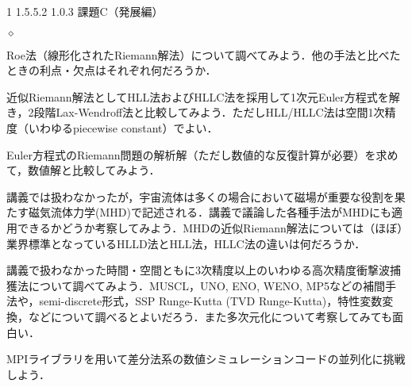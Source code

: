 \documentclass[10pt,a4j]{jarticle}
\makeatletter
\renewenvironment{itemize}%
{%
\begin{list}{$\diamond$}
{%
  \setlength{\topsep}{0.0em}
  \setlength{\parskip}{0.0em}
  \setlength{\parsep}{0.0em}
  \setlength{\itemsep}{0.25em}
  \setlength{\itemindent}{1zw}
  \setlength{\leftmargin}{2zw}
  \setlength{\rightmargin}{0zw}
  \setlength{\labelsep}{0.5zw}
  \setlength{\labelwidth}{1zw}
  \setlength{\listparindent}{0zw}
}
}{%
\end{list}%
}
\renewcommand{\section}{\@startsection{section}%
   {1}%
   {\z@}%
   {1.5\Cvs \@plus.5\Cvs \@minus.2\Cvs}%
   {1.0\Cvs \@plus.3\Cvs}%
   {\centering\normalfont\LARGE\bfseries}}%
\makeatother
\begin{document}
\hypertarget{ux8ab2ux984ccux767aux5c55ux7de8}{%
\section{課題C（発展編）}\label{ux8ab2ux984ccux767aux5c55ux7de8}}

\begin{itemize}
\item
  Roe法（線形化されたRiemann解法）について調べてみよう．他の手法と比べたときの利点・欠点はそれぞれ何だろうか．
\item
  近似Riemann解法としてHLL法およびHLLC法を採用して1次元Euler方程式を解き，2段階Lax-Wendroff法と比較してみよう．ただしHLL/HLLC法は空間1次精度（いわゆるpiecewise
  constant）でよい．
\item
  Euler方程式のRiemann問題の解析解（ただし数値的な反復計算が必要）を求めて，数値解と比較してみよう．
\item
  講義では扱わなかったが，宇宙流体は多くの場合において磁場が重要な役割を果たす磁気流体力学(MHD)で記述される．講義で議論した各種手法がMHDにも適用できるかどうか考察してみよう．MHDの近似Riemann解法については（ほぼ）業界標準となっているHLLD法とHLL法，HLLC法の違いは何だろうか．
\item
  講義で扱わなかった時間・空間ともに3次精度以上のいわゆる高次精度衝撃波捕獲法について調べてみよう．MUSCL，UNO,
  ENO, WENO, MP5などの補間手法や，semi-discrete形式，SSP Runge-Kutta
  (TVD
  Runge-Kutta)，特性変数変換，などについて調べるとよいだろう．また多次元化について考察してみても面白い．
\item
  MPIライブラリを用いて差分法系の数値シミュレーションコードの並列化に挑戦しよう．
\end{itemize}
\end{document}
